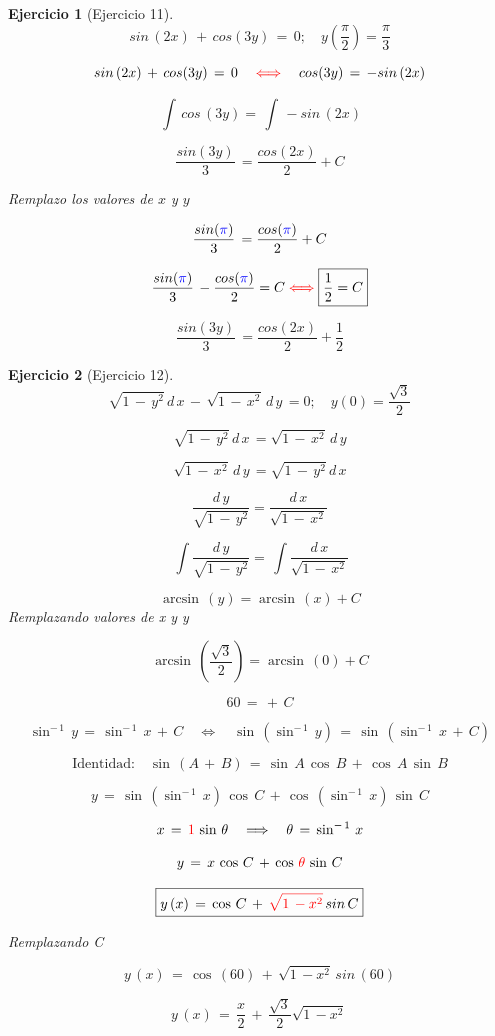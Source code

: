 \documentclass[a4paper,11pt]{book}
\newtheorem{ejer}{Ejercicio}[section]
\begin{document}
\begin{ejer}[Ejercicio 11] 
$$ sin\,(2x)\,+\,cos(3y)\,=\,0;\quad y(\dfrac{\pi}{2}) = \dfrac{\pi}{3} $$
  
$$ sin\,(2x)\,+\,cos(3y)\,=\,0 \quad \textcolor{red}{\iff} \quad cos(3y)\,=\, -sin\,(2x) $$


$$\displaystyle\,\int\,cos\,(3y) = \displaystyle\,\int\,-sin\,(2x) $$

$$\boxed{ \dfrac{sin(3y)}{3}\,=\dfrac{cos(2x)}{2} + C}$$

Remplazo los valores de $x$ y $y$ 

$$\dfrac{sin (\textcolor{blue}{\pi} )}{3}\,=\dfrac{cos(\textcolor{blue}{\pi})}{2} + C$$

$$\dfrac{sin (\textcolor{blue}{\pi} )}{3}\,-\dfrac{cos(\textcolor{blue}{\pi})}{2} = C \textcolor{red}{\iff} \boxed{\dfrac{1}{2} = C} $$

$$\boxed{ \dfrac{sin(3y)}{3}\,=\dfrac{cos(2x)}{2} + \dfrac{1}{2}}$$

\end{ejer} 

  

\begin{ejer}[Ejercicio 12] 

  $$\sqrt{1\,-\,y^{2}}\,d\,x\,-\,\sqrt{1\,-\,x^{2}}\,d\,y\,= 0; \quad y(0)=\dfrac{\sqrt{3}}{2}  $$  
 
 $$\sqrt{1\,-\,y^{2}}\,d\,x\,= \sqrt{1\,-\,x^{2}}\,d\,y $$
 
 $$\sqrt{1\,-\,x^{2}}\,d\,y\,= \sqrt{1\,-\,y^{2}}\,d\,x $$
 
 $$ \dfrac{d\,y}{\sqrt{1\,-\,y^{2}}} = \dfrac{d\,x}{\sqrt{1\,-\,x^{2}}} $$
 
   $$\displaystyle\,\int \dfrac{d\,y}{\sqrt{1\,-\,y^{2}}} = \displaystyle\,\int \dfrac{d\,x}{\sqrt{1\,-\,x^{2}}} $$
   
   
   $$ \arcsin\,(y) = \arcsin\,(x) + C$$
 Remplazando valores de x y y
 
 $$ \arcsin\,(\dfrac{\sqrt{3}}{2}) = \arcsin\,(0) + C$$
 
 
 $$ 60\,=\,+\,C$$

$$\sin^{-\,1}\,y\,=\,\sin^{-\,1}\,x\,+\,C \quad \iff \quad \sin\,(\sin^{-\,1}\,y)\,=\,\sin\,(\sin^{-\,1}\,x\,+\,C)$$

 

$$\text{Identidad:} \quad \sin\,(A\,+\,B)\,=\,\sin\,A\,\cos\,B\,+\,\cos\,A\,\sin\,B$$

 

$$y\,=\,\sin\,(\sin^{-\,1}\,x)\,\cos\,C\,+\,\cos\,(\sin^{-\,1}\,x)\,\sin\,C$$

 $$x\,=\,\textcolor{red}{1}\,\sin\,\theta \quad \Longrightarrow \quad \theta\,=\,\sin^{-\,1}\,x$$

$$y\,=\,x\,\cos\,C\,+\,\cos\,\textcolor{red}{\theta}\,\sin\,C$$

$$ \boxed{y\,(x)\,=\,\cos\,C\,+\,\textcolor{red}{\sqrt{1\,-x^{2}}}\,sin\,C} $$


Remplazando C

$$ y\,(x)\,=\,\cos\,(60)\,+\,\sqrt{1\,-x^{2}}\,sin\,(60) $$

$$ \boxed{y\,(x)\,=\,\dfrac{x}{2}\,+\, \dfrac{\sqrt{3}}{2} \sqrt{1\,-x^{2}}\, }$$

\end{ejer} 
\end{document}

